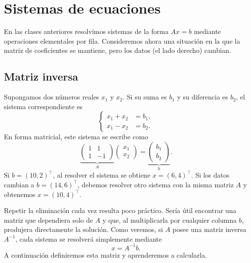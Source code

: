 \documentclass[compacto,10pt]{pubciencias-notas}
\begin{document}
\encabezado

\vspace*{-8mm}

\setcounter{section}{1}
\section{Sistemas de ecuaciones}

En las clases anteriores resolvimos sistemas de la forma $Ax=b$ mediante
operaciones elementales por fila. Consideremos ahora una situación en la que
la matriz de coeficientes se mantiene, pero los datos (el lado derecho) cambian.

\setcounter{subsection}{2}
\subsection{Matriz inversa}


\begin{ejem}\label{sem04cl01:motivacion}
    Supongamos dos números reales $x_1$ y $x_2$. Si su suma es $b_1$ y su
    diferencia es $b_2$, el sistema correspondiente es
    \[
        \left\{\begin{aligned}
            x_1+x_2&=b_1,\\
            x_1-x_2&=b_2.
        \end{aligned}\right.
    \]
    En forma matricial, este sistema se escribe como
    \[
        \underbrace{\begin{pmatrix}1&1\\1&-1\end{pmatrix}}_{A}
        \begin{pmatrix}x_1\\x_2\end{pmatrix}
        =\underbrace{\begin{pmatrix}b_1\\b_2\end{pmatrix}}_{b}.
    \]
    Si $b=(10,2)^{\top}$, al resolver el sistema se obtiene
    $x=(6,4)^{\top}$. Si los datos cambian a $b=(14,6)^{\top}$, debemos
    resolver otro sistema con la misma matriz $A$ y obtenemos
    $x=(10,4)^{\top}$.

    Repetir la eliminación cada vez resulta poco práctico. Sería útil encontrar
    una matriz que dependiera solo de $A$ y que, al multiplicarla por cualquier
    columna $b$, produjera directamente la solución. Como veremos, si $A$ posee
    una matriz inversa $A^{-1}$, cada sistema se resolverá simplemente mediante
    \[
        x=A^{-1}b.
    \]
    A continuación definiremos esta matriz y aprenderemos a calcularla.
\end{ejem}
\end{document}
